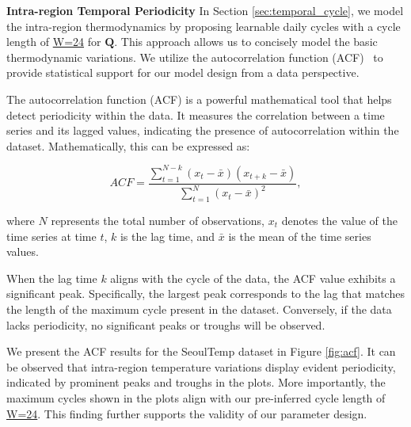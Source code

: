 \textbf{Intra-region Temporal Periodicity} In Section \ref{sec:temporal_cycle}, we model the intra-region thermodynamics by proposing learnable daily cycles with a cycle length of \underline{W=24} for $\mathbf{Q}$. This approach allows us to concisely model the basic thermodynamic variations. We utilize the autocorrelation function (ACF)~\cite{madsen2007time} to provide statistical support for our model design from a data perspective.

The autocorrelation function (ACF) is a powerful mathematical tool that helps detect periodicity within the data. It measures the correlation between a time series and its lagged values, indicating the presence of autocorrelation within the dataset. Mathematically, this can be expressed as:

\begin{equation}
ACF = \frac{\sum_{t=1}^{N-k}(x_t - \bar{x})(x_{t+k} - \bar{x})}{\sum_{t=1}^{N}(x_t - \bar{x})^2},
\end{equation}

where \( N \) represents the total number of observations, \( x_t \) denotes the value of the time series at time \( t \), \( k \) is the lag time, and \( \bar{x} \) is the mean of the time series values.

When the lag time \( k \) aligns with the cycle of the data, the ACF value exhibits a significant peak. Specifically, the largest peak corresponds to the lag that matches the length of the maximum cycle present in the dataset. Conversely, if the data lacks periodicity, no significant peaks or troughs will be observed.


We present the ACF results for the SeoulTemp dataset in Figure \ref{fig:acf}. It can be observed that intra-region temperature variations display evident periodicity, indicated by prominent peaks and troughs in the plots. More importantly, the maximum cycles shown in the plots align with our pre-inferred cycle length of \underline{W=24}. This finding further supports the validity of our parameter design.
